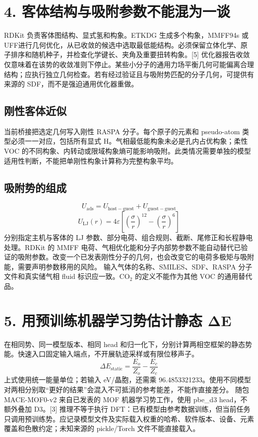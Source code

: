\documentclass[UTF8,a4paper,11pt]{ctexart}
\begin{document}
\section*{4. 客体结构与吸附参数不能混为一谈}
RDKit 负责客体图结构、显式氢和构象。ETKDG 生成多个构象，MMFF94s 或 UFF进行几何优化，从已收敛的候选中选取最低能结构。必须保留立体化学、原子排序和随机种子，并检查化学键长、夹角及重要扭转构象。[5]
优化器报告收敛仅意味着在该势的收敛准则下停止。某些小分子的通用力场平衡几何可能偏离合理结构；应执行独立几何检查。若有经过验证且与吸附势匹配的分子几何，可提供有来源的 SDF，而不是强迫通用优化器重做。
\subsection*{刚性客体近似}
当前桥接把选定几何写入刚性 RASPA 分子。每个原子的元素和 pseudo-atom 类型必须一一对应，包括所有显式 H。气相最低能构象未必是孔内占优构象；柔性VOC 的不同构象、内转动或限域构象熵可能影响吸附。此类情况需要单独的模型适用性判断，不能把单刚性构象计算称为完整构象平均。
\subsection*{吸附势的组成}
\begin{equation*}
U_{\mathrm{ads}}=U_{\mathrm{host-guest}}+U_{\mathrm{guest-guest}}
\end{equation*}
\begin{equation*}
U_{\mathrm{LJ}}(r)=4\varepsilon\left[\left(\frac{\sigma}{r}\right)^{12}-\left(\frac{\sigma}{r}\right)^6\right]
\end{equation*}
分别指定主机与客体的 LJ 参数、部分电荷、组合规则、截断、尾修正和长程静电处理。RDKit 的 MMFF 电荷、气相优化能和分子内部势参数不能自动替代已验证的吸附参数。改变一个已发表刚性分子的几何，也会改变它的电荷多极矩与吸附能，需要声明参数移用的风险。
输入气体的名称、SMILES、SDF、RASPA 分子文件和真实储气相 fluid 标识应一致。CO\ensuremath{_{2}} 的定义不能作为其他 VOC 的通用替代品。
\clearpage
\section*{5. 用预训练机器学习势估计静态 ΔE}
在相同势、同一模型版本、相同 head 和归一化下，分别计算两相空框架的静态势能。快速入口固定输入端点，不开展轨迹采样或有限位移声子。
\begin{equation*}
\Delta E_{\mathrm{static}}=\frac{E_o}{Z_o}-\frac{E_c}{Z_c}
\end{equation*}
上式使用统一能量单位；若输入 eV/晶胞，还需乘 96.4853321233。使用不同模型对两相分别取“更好的结果”会混入不可抵消的参考能差，不能作直接差分。
随包 MACE-MOF0-v2 来自已发表的 MOF 机器学习势工作，使用 pbe\_d3 head，不额外叠加 D3。[3] 推理不等于执行 DFT：已有模型由参考数据训练，但当前任务只调用预训练势。应记录模型文件及实际载入权重的哈希、软件版本、设备、元素覆盖和色散约定；未知来源的 pickle/Torch 文件不能直接载入。
\end{document}
